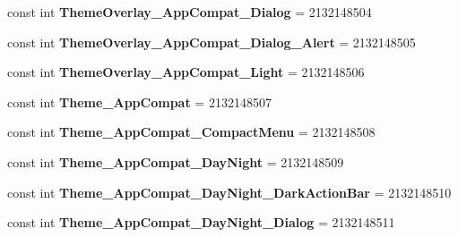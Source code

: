 \begin{DoxyCompactItemize}
\mbox{\label{classst_delivery_1_1_resource_1_1_style_ae1891ee5bc61bcaa952ce3a01093ad78}} 
const int {\bfseries Theme\+Overlay\+\_\+\+App\+Compat\+\_\+\+Dialog} = 2132148504
\item 
\mbox{\label{classst_delivery_1_1_resource_1_1_style_a8d8723a688af847468e4ab8f67535b6c}} 
const int {\bfseries Theme\+Overlay\+\_\+\+App\+Compat\+\_\+\+Dialog\+\_\+\+Alert} = 2132148505
\item 
\mbox{\label{classst_delivery_1_1_resource_1_1_style_a65aa4aa190efaa076e4fcdd22cd5dfcc}} 
const int {\bfseries Theme\+Overlay\+\_\+\+App\+Compat\+\_\+\+Light} = 2132148506
\item 
\mbox{\label{classst_delivery_1_1_resource_1_1_style_a1f0cae5e34e660e11c7a3f1de311c134}} 
const int {\bfseries Theme\+\_\+\+App\+Compat} = 2132148507
\item 
\mbox{\label{classst_delivery_1_1_resource_1_1_style_aeb8192978349d815eb3204c517153d03}} 
const int {\bfseries Theme\+\_\+\+App\+Compat\+\_\+\+Compact\+Menu} = 2132148508
\item 
\mbox{\label{classst_delivery_1_1_resource_1_1_style_aa0a3a1bab159d2a3d5dc6de5b73cf389}} 
const int {\bfseries Theme\+\_\+\+App\+Compat\+\_\+\+Day\+Night} = 2132148509
\item 
\mbox{\label{classst_delivery_1_1_resource_1_1_style_a7f1a8dc8872463d09c5b985a1a77a577}} 
const int {\bfseries Theme\+\_\+\+App\+Compat\+\_\+\+Day\+Night\+\_\+\+Dark\+Action\+Bar} = 2132148510
\item 
\mbox{\label{classst_delivery_1_1_resource_1_1_style_ae756e0c3f154f34d066460d1f8bf201d}} 
const int {\bfseries Theme\+\_\+\+App\+Compat\+\_\+\+Day\+Night\+\_\+\+Dialog} = 2132148511
\item 
\mbox{\label{classst_delivery_1_1_resource_1_1_style_aa6bf6311482706bace30feeceb9349fe}} 

\end{DoxyCompactItemize}
